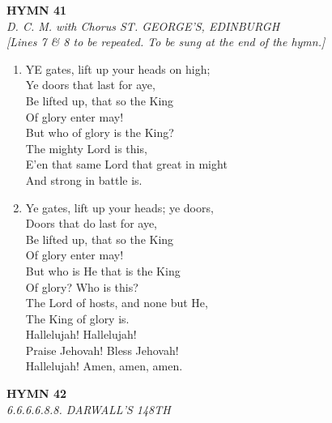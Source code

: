 \documentclass[11pt,a4paper]{article}
\begin{document}
\newpage
\begin{center}
    {\Large \textbf{HYMN 41}}
    \\
    \textit{D. C. M. with Chorus ST. GEORGE'S, EDINBURGH}
    \\
    \textit{\small [Lines 7 & 8 to be repeated. To be sung at the end of the hymn.]}
\end{center}
\vspace{1em}

\begin{enumerate}
    \item YE gates, lift up your heads on high; \\
        Ye doors that last for aye, \\
        Be lifted up, that so the King \\
        Of glory enter may! \\
        But who of glory is the King? \\
        The mighty Lord is this, \\
        E'en that same Lord that great in might \\
        And strong in battle is.

    \item Ye gates, lift up your heads; ye doors, \\
        Doors that do last for aye, \\
        Be lifted up, that so the King \\
        Of glory enter may! \\
        But who is He that is the King \\
        Of glory? Who is this? \\
        The Lord of hosts, and none but He, \\
        The King of glory is. \\
        Hallelujah! Hallelujah! \\
        Praise Jehovah! Bless Jehovah! \\
        Hallelujah! Amen, amen, amen.

\end{enumerate}

\newpage
\begin{center}
    {\Large \textbf{HYMN 42}}
    \\
    \textit{6.6.6.6.8.8. DARWALL'S 148TH}
\end{center}
\vspace{1em}
\end{document}
